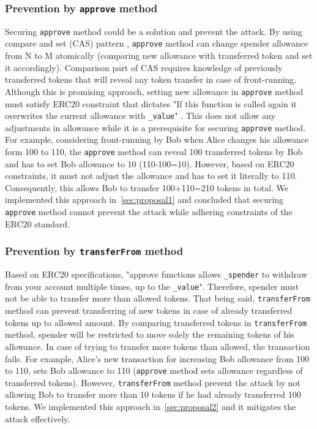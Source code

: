 	
\subsubsection*{Prevention by \texttt{approve} method} Securing \texttt{approve} method could be a solution and prevent the attack. By using compare and set (CAS) pattern \cite{Ref06}, \texttt{approve} method can change spender allowance from N to M atomically (\ie comparing new allowance with transferred token and set it accordingly). Comparison part of CAS requires knowledge of previously transferred tokens that will reveal any token transfer in case of front-running. Although this is promising approach,  setting new allowance in \texttt{approve} method must satisfy ERC20 constraint that dictates "If this function is called again it overwrites the current allowance with \texttt{\_value}" \cite{Ref08}. This does not allow any adjustments in allowance while it is a prerequisite for securing \texttt{approve} method. 
For example, considering front-running by Bob when Alice changes his allowance form 100 to 110, the \texttt{approve} method can reveal 100 transferred tokens by Bob and has to set Bob allowance to 10 (110-100=10). However, based on ERC20 constraints, it must not adjust the allowance and has to set it literally to 110. Consequently, this allows Bob to transfer 100+110=210 tokens in total. We implemented this approach in~\ref{sec:proposal1} and concluded that securing \texttt{approve} method cannot prevent the attack while adhering constraints of the ERC20 standard.
	
\subsubsection*{Prevention by \texttt{transferFrom} method} Based on ERC20 specifications, "approve functions allows \texttt{\_spender} to withdraw from your account multiple times, up to the \texttt{\_value}". Therefore, spender must not be able to transfer more than allowed tokens. That being said, \texttt{transferFrom} method can prevent transferring of new tokens in case of already transferred tokens up to allowed amount. By comparing transferred tokens in \texttt{transferFrom} method, spender will be restricted to move solely the remaining tokens of his allowance. In case of trying to transfer more tokens than allowed, the transaction fails. For example, Alice's new transaction for increasing Bob allowance from 100 to 110, sets Bob allowance to 110 (\texttt{approve} method sets allowance regardless of transferred tokens). However, \texttt{transferFrom} method prevent the attack by not allowing Bob to transfer more than 10 tokens if he had already transferred 100 tokens. We implemented this approach in~\ref{sec:proposal2} and it mitigates the attack effectively.

